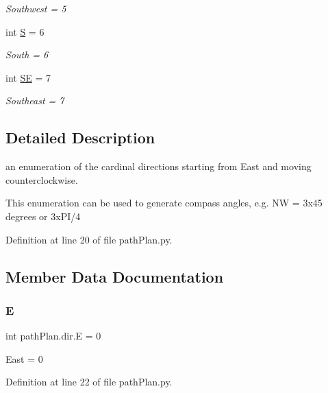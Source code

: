 \begin{DoxyCompactItemize}
\begin{DoxyCompactList}\small\item\em Southwest = 5 \end{DoxyCompactList}\item 
int \mbox{\hyperlink{classpath_plan_1_1dir_a14b947b877f00f3e35eccb4861881e54}{S}} = 6
\begin{DoxyCompactList}\small\item\em South = 6 \end{DoxyCompactList}\item 
int \mbox{\hyperlink{classpath_plan_1_1dir_a55469a6c02f71d2523630d56fe8d928c}{SE}} = 7
\begin{DoxyCompactList}\small\item\em Southeast = 7 \end{DoxyCompactList}\end{DoxyCompactItemize}


\subsection{Detailed Description}
an enumeration of the cardinal directions starting from East and moving counterclockwise. 

This enumeration can be used to generate compass angles, e.\+g. NW = 3x45 degrees or 3x\+P\+I/4 

Definition at line 20 of file path\+Plan.\+py.



\subsection{Member Data Documentation}
\mbox{\label{classpath_plan_1_1dir_ab95be1946ae2011628f9c023ac3c70b8}} 
\subsubsection{\texorpdfstring{E}{E}}
{\footnotesize\ttfamily int path\+Plan.\+dir.\+E = 0\hspace{0.3cm}{\ttfamily [static]}}



East = 0 



Definition at line 22 of file path\+Plan.\+py.

\mbox{\label{classpath_plan_1_1dir_adb5f0ffd07f156432f4932bef84c8860}} 
